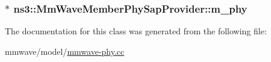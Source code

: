 \subsubsection[{\texorpdfstring{m\+\_\+phy}{m_phy}}]{$\ast$ ns3\+::\+Mm\+Wave\+Member\+Phy\+Sap\+Provider\+::m\+\_\+phy\hspace{0.3cm}{\ttfamily [private]}}\hypertarget{classns3_1_1MmWaveMemberPhySapProvider_abb62af2710d783ae91e4fd71c41dfc0b}{}\label{classns3_1_1MmWaveMemberPhySapProvider_abb62af2710d783ae91e4fd71c41dfc0b}


The documentation for this class was generated from the following file\+:\begin{DoxyCompactItemize}
\item 
mmwave/model/\hyperlink{mmwave-phy_8cc}{mmwave-\/phy.\+cc}\end{DoxyCompactItemize}
